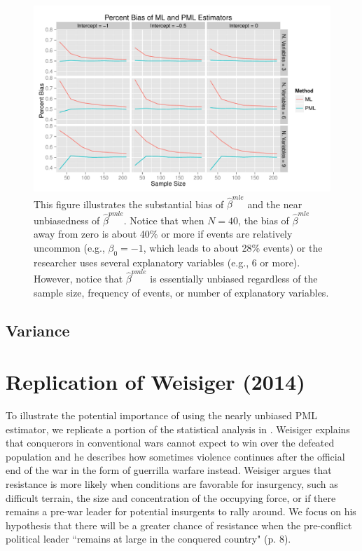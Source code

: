 \documentclass[12pt]{article}
\begin{document}
\begin{figure}[H]
\begin{center}
\includegraphics[width = \textwidth]{figs/sims-percent-bias.pdf}
\caption{This figure illustrates the substantial bias of $\hat{\beta}^{mle}$ and the near unbiasedness of $\hat{\beta}^{pmle}$. Notice that when $N = 40$, the bias of $\hat{\beta}^{mle}$ away from zero is about 40\% or more if events are relatively uncommon (e.g., $\beta_0 = -1$, which leads to about 28\% events) or the researcher uses several explanatory variables (e.g., 6 or more). However, notice that $\hat{\beta}^{pmle}$ is essentially unbiased regardless of the sample size, frequency of events, or number of explanatory variables.}\label{fig:sims-coef-perc-bias}
\end{center}
\end{figure}

\subsection*{Variance}

\section*{Replication of Weisiger (2014)}

To illustrate the potential importance of using the nearly unbiased PML estimator, we replicate a portion of the statistical analysis in \cite{Weisiger2014}. 
Weisiger explains that conquerors in conventional wars cannot expect to win over the defeated population and he describes how sometimes violence continues after the official end of the war in the form of guerrilla warfare instead. 
Weisiger argues that resistance is more likely when conditions are favorable for insurgency, such as difficult terrain, the size and concentration of the occupying force, or if there remains a pre-war leader for potential insurgents to rally around. 
We focus on his hypothesis that there will be a greater chance of resistance when the pre-conflict political leader ``remains at large in the conquered country" (p. 8).
\end{document}
